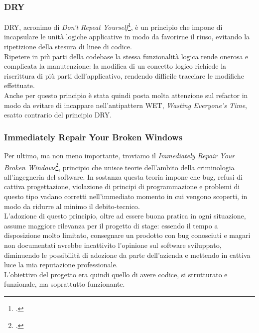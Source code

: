 \subsubsection{DRY}
DRY, acronimo di \textit{Don't Repeat Yourself}\footcite{article:drykiss}, è un principio che impone di incapsulare le unità logiche applicative in modo da favorirne il riuso, evitando la ripetizione della stesura di linee di codice. \\
Ripetere in più parti della codebase la stessa funzionalità logica rende onerosa e complicata la manutenzione: la modifica di un concetto logico richiede la riscrittura di più parti dell'applicativo, rendendo difficile tracciare le modifiche effettuate.\\
Anche per questo principio è stata quindi posta molta attenzione sul \gls{refactor} in modo da evitare di incappare nell'antipattern WET, \textit{Wasting Everyone's Time}, esatto contrario del principio DRY.
\subsubsection{Immediately Repair Your Broken Windows}
Per ultimo, ma non meno importante, troviamo il \textit{Immediately Repair Your Broken Windows}\footcite{article:brokenwindow}, principio che unisce teorie dell'ambito della criminologia all'ingegneria del software. In sostanza questa teoria impone che bug, refusi di cattiva progettazione, violazione di principi di programmazione e problemi di questo tipo vadano corretti nell'immediato momento in cui vengono scoperti, in modo da ridurre al minimo il \gls{debito-tecnico}. \\
L'adozione di questo principio, oltre ad essere buona pratica in ogni situazione, assume maggiore rilevanza per il progetto di stage: essendo il tempo a disposizione molto limitato, consegnare un prodotto con bug conosciuti e magari non documentati avrebbe incattivito l'opinione sul software sviluppato, diminuendo le possibilità di adozione da parte dell'azienda e mettendo in cattiva luce la mia reputazione professionale. \\
L'obiettivo del progetto era quindi quello di avere codice, si strutturato e funzionale, ma soprattutto funzionante.

